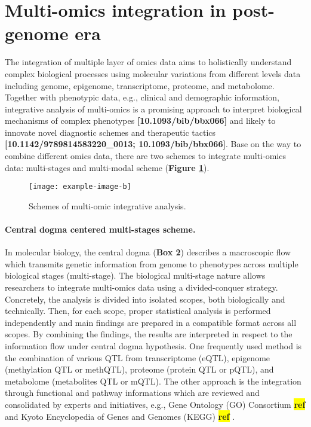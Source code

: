 \documentclass[12pt,usletter,fancy]{elegantbook}
\newcommand{\reqref}[1][ref]{
  \colorbox{yellow}{\textbf{#1}}
}
\begin{document}
\section*{Multi-omics integration in post-genome era}
The integration of multiple layer of omics data aims to holistically understand complex biological processes using molecular variations from different levels data including genome, epigenome, transcriptome, proteome, and metabolome.
Together with phenotypic data, e.g., clinical and demographic information, integrative analysis of multi-omics is a promising approach to interpret biological mechanisms of complex phenotypes \textbf{[10.1093/bib/bbx066]} and likely to innovate novel diagnostic schemes and therapeutic tactics \textbf{[10.1142/9789814583220\_0013; 10.1093/bib/bbx066]}.
Base on the way to combine different omics data, there are two schemes to integrate multi-omics data: multi-stages and multi-modal scheme (\textbf{Figure \ref{fig:example-image-b}}).

\begin{figure}[h]
  \centering
  \texttt{[image: example-image-b]}
  \vspace*{0.2cm}
  \caption{Schemes of multi-omic integrative analysis.}
  \label{fig:example-image-b}
\end{figure}

\paragraph*{Central dogma centered multi-stages scheme.}
In molecular biology, the central dogma (\textbf{Box 2}) describes a macroscopic flow which transmits genetic information from genome to phenotypes across multiple biological stages (multi-stage).
The biological multi-stage nature allows researchers to integrate multi-omics data using a divided-conquer strategy.
Concretely, the analysis is divided into isolated scopes, both biologically and technically.
Then, for each scope, proper statistical analysis is performed independently and main findings are prepared in a compatible format across all scopes.
By combining the findings, the results are interpreted in respect to the information flow under central dogma hypothesis.
One frequently used method is the combination of various QTL from transcriptome (eQTL), epigenome (methylation QTL or methQTL), proteome (protein QTL or pQTL), and metabolome (metabolites QTL or mQTL).
The other approach is the integration through functional and pathway informations which are reviewed and consolidated by experts and initiatives, e.g., Gene Ontology (GO) Consortium\reqref and Kyoto Encyclopedia of Genes and Genomes (KEGG)\reqref.
\end{document}

